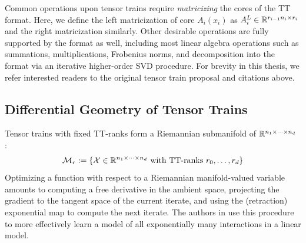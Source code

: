 Common operations upon tensor trains require \textit{matricizing} the cores of the TT format. Here, we define the left matricization of core $A_i(x_i)$ as $A_i^L \in \mathbb{R}^{r_{i-1}n_i \times r_i} $ and the right matricization similarly.
Other desirable operations are fully supported by the format as well,
including most linear algebra operations such as summations,
multiplications, Frobenius norms,
and decomposition into the format via an iterative higher-order SVD procedure.
For brevity in this thesis, we refer interested readers
to the original tensor train proposal and citations above.

\subsection{Differential Geometry of Tensor Trains}
Tensor trains with fixed TT-ranks form a Riemannian submanifold of $\mathbb{R}^{n_1 \times \cdots \times n_d}$ \cite{lubich2015time, holtz2012manifolds}:
\begin{align}\label{eq:riem}
	\mathcal{M}_r := \{ \mathcal{X} \in \mathbb{R}^{n_1 \times \cdots \times n_d} \text{ with TT-ranks\ } r_0,\ldots,r_d\} 
\end{align}
Optimizing a function with respect to a Riemannian manifold-valued variable amounts to computing a free derivative in the ambient space, projecting the gradient to the tangent space of the current iterate, and using the (retraction) exponential map to compute the next iterate.
The authors in \cite{novikov2016exponential} use this procedure to more effectively learn a model of all exponentially many interactions in a linear model.
